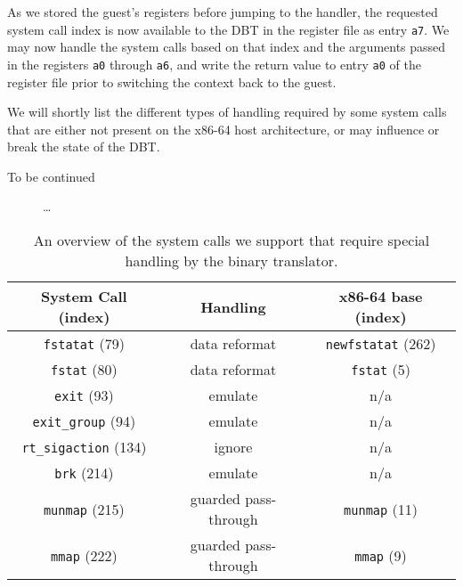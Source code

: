 As we stored the guest's registers before jumping to the handler, the requested system call index is now available to the DBT in the register file as entry \texttt{a7}.
We may now handle the system calls based on that index and the arguments passed in the registers \texttt{a0} through \texttt{a6}, and write the return value to entry \texttt{a0} of the register file prior to switching the context back to the guest.

We will shortly list the different types of handling required by some system calls that are either not present on the x86-64 host architecture, or may influence or break the state of the DBT.
\begin{description}
	\item[To be continued] \ldots
\end{description}

\begin{table}
	\centering
	\begin{tabular}{ccc}
		\toprule
		\textbf{System Call (index)} & \textbf{Handling} & \textbf{x86-64 base (index)}\\ 
		\midrule
				\texttt{fstatat} (79) & data reformat & \texttt{newfstatat} (262)\\
		\texttt{fstat} (80) & data reformat & \texttt{fstat} (5)\\
		\texttt{exit} (93) & emulate & n/a\\
		\texttt{exit\_group} (94) & emulate & n/a\\
		\texttt{rt\_sigaction} (134) & ignore & n/a\\
		\texttt{brk} (214) & emulate & n/a\\
		\texttt{munmap} (215) & guarded pass-through & \texttt{munmap} (11)\\
		\texttt{mmap} (222) & guarded pass-through & \texttt{mmap} (9)\\
		\bottomrule
	\end{tabular}
	\caption{An overview of the system calls we support that require special handling by the binary translator.}
\end{table}